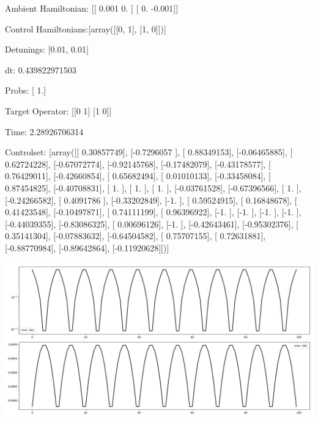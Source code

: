 \documentclass{article}
\begin{document}
    

\newpage

Ambient Hamiltonian: [[ 0.001  0.   ]
 [ 0.    -0.001]]

Control Hamiltonians:[array([[0, 1],
       [1, 0]])]

Detunings: [0.01, 0.01]

 dt: 0.439822971503

Probs: [ 1.]

Target Operator: [[0 1]
 [1 0]]

Time: 2.28926706314

Controlset: [array([[ 0.30857749],
       [-0.7296057 ],
       [ 0.88349153],
       [-0.06465885],
       [ 0.62724228],
       [-0.67072774],
       [-0.92145768],
       [-0.17482079],
       [-0.43178577],
       [ 0.76429011],
       [-0.42660854],
       [ 0.65682494],
       [ 0.01010133],
       [-0.33458084],
       [ 0.87454825],
       [-0.40708831],
       [ 1.        ],
       [ 1.        ],
       [ 1.        ],
       [-0.03761528],
       [-0.67396566],
       [ 1.        ],
       [-0.24266582],
       [ 0.4091786 ],
       [-0.33202849],
       [-1.        ],
       [ 0.59524915],
       [ 0.16848678],
       [ 0.41423548],
       [-0.10497871],
       [ 0.74111199],
       [ 0.96396922],
       [-1.        ],
       [-1.        ],
       [-1.        ],
       [-1.        ],
       [-0.44039355],
       [-0.83086325],
       [ 0.00696126],
       [-1.        ],
       [-0.42643461],
       [-0.95302376],
       [ 0.35141304],
       [-0.07883632],
       [-0.64504582],
       [ 0.75707155],
       [ 0.72631881],
       [-0.88770984],
       [-0.89642864],
       [-0.11920628]])]
\begin{center}
\includegraphics[scale=.9]{control_dpn_all.png}

\end{center}
\end{document}

